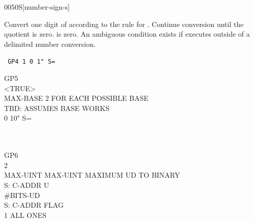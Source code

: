 \begin{worddef}[numS]{0050}{\num{}S}[number-sign-s]
\item {}

	Convert one digit of  according to the rule for
	. Continue conversion until the quotient is zero.
	 is zero. An ambiguous condition exists if
	 executes outside of a  
	delimited number conversion.


	\begin{testing} %
		\ttfamily
		\texttt{\word{:} GP4   1 0    1" S= \word{;}} \\

		\word{:} GP5 \\
		\tab {}  <TRUE> \\
		\tab MAX-BASE  2 		\tab[2]  FOR EACH POSSIBLE BASE \\
		\tab[2]   \word{!}	\tab[5.8]  TBD: ASSUMES BASE WORKS \\
		\tab[3]  0     10" S=  \\
		\tab    {} \\
		\tab    {}  \word{!} \word{;} \\

		\word{:} GP6 \\
		\tab	{}    2  \word{!} \\
		\tab	MAX-UINT MAX-UINT   	\tab		{} MAXIMUM UD TO BINARY \\
		\tab	{}  \word{!}								\tab[10.6]	 S: C-ADDR U \\
		\tab	{} \#BITS-UD \word{=}  \\
		 														\tab[13.6]	 S: C-ADDR FLAG \\
		\tab[2]		  \word{[CHAR]} 1 \word{=} 	\tab[1.2]	 ALL ONES \\
		\tab[2]		   \\
		\tab	{}   \word{;} \\


\end{testing}
\end{worddef}
